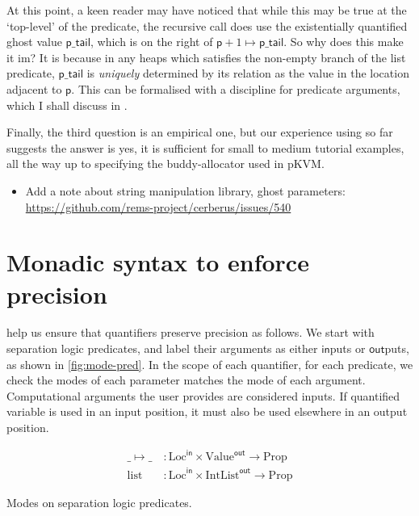 At this point, a keen reader may have noticed that while this may be true at
the `top-level' of the predicate, the recursive call does use the existentially
quantified ghost value $\mathsf{p\_tail}$, which is on the right of $\mathsf{p}
+ 1 \mapsto{} \mathsf{p\_tail}$. So why does this make it im? It is
because in any heaps which satisfies the non-empty branch of the list
predicate, $\mathsf{p\_tail}$ is \emph{uniquely} determined by its relation as
the value in the location adjacent to $\mathsf{p}$. This can be formalised with a 
discipline for predicate arguments, which I shall discuss in
.

Finally, the third question is an empirical one, but our experience using
 so far~ suggests the answer is
yes, it is sufficient for small to medium tutorial examples, all the way up to
specifying the buddy-allocator used in pKVM\@.

\begin{itemize}
    \item Add a note about string manipulation library, ghost parameters:
        \url{https://github.com/rems-project/cerberus/issues/540}
\end{itemize}

\section{Monadic syntax to enforce precision}\label{sec:monadic-syntax}

 help us ensure that quantifiers preserve precision as
follows. We start with separation logic predicates, and label their arguments
as either $\mathsf{in}$puts or $\mathsf{out}$puts, as shown in
\cref{fig:mode-pred}. In the scope of each quantifier, for each predicate, we
check the modes of each parameter matches the mode of each argument.
Computational arguments the user provides are considered inputs. If quantified
variable is used in an input position, it must also be used elsewhere in an
output position.

\begin{marginfigure}
    \centering
    \begin{align*}
        \_ \mapsto{} \_ \:&: \mathrm{Loc}^{\mathsf{in}} \times \mathrm{Value}^{\mathsf{out}} \rightarrow \mathrm{Prop} \\
        \mathrm{list} \:&: \mathrm{Loc}^{\mathsf{in}} \times \mathrm{IntList}^{\mathsf{out}} \rightarrow \mathrm{Prop}
    \end{align*}
    \caption{Modes on separation logic predicates.}\label{fig:mode-pred}
\end{marginfigure}

